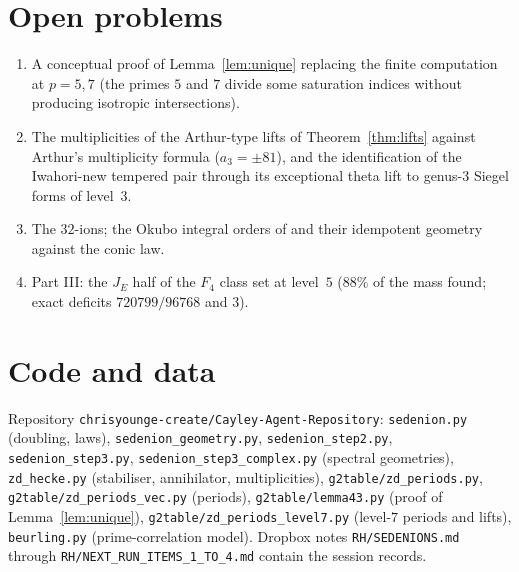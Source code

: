 \documentclass[11pt]{amsart}
\theoremstyle{definition}
\begin{document}
\section{Open problems}
\begin{enumerate}[leftmargin=2em]
\item A conceptual proof of Lemma~\ref{lem:unique} replacing the finite computation at $p=5,7$ (the primes $5$ and $7$ divide some saturation indices without producing isotropic intersections).
\item The multiplicities of the Arthur-type lifts of Theorem~\ref{thm:lifts} against Arthur's multiplicity formula ($a_3=\pm 81$), and the identification of the Iwahori-new tempered pair through its exceptional theta lift to genus-$3$ Siegel forms of level~$3$.
\item The $32$-ions; the Okubo integral orders of \cite{Corr26} and their idempotent geometry against the conic law.
\item Part III: the $J_E$ half of the $F_4$ class set at level~$5$ ($88\%$ of the mass found; exact deficits $720799/96768$ and $3$).
\end{enumerate}

\appendix
\section{Code and data}
Repository \texttt{chrisyounge-create/Cayley-Agent-Repository}: \texttt{sedenion.py} (doubling, laws), \texttt{sedenion\_geometry.py}, \texttt{sedenion\_step2.py}, \texttt{sedenion\_step3.py}, \texttt{sedenion\_step3\_complex.py} (spectral geometries), \texttt{zd\_hecke.py} (stabiliser, annihilator, multiplicities), \texttt{g2table/zd\_periods.py}, \texttt{g2table/zd\_periods\_vec.py} (periods), \texttt{g2table/lemma43.py} (proof of Lemma~\ref{lem:unique}), \texttt{g2table/zd\_periods\_level7.py} (level-$7$ periods and lifts), \texttt{beurling.py} (prime-correlation model). Dropbox notes \texttt{RH/SEDENIONS.md} through \texttt{RH/NEXT\_RUN\_ITEMS\_1\_TO\_4.md} contain the session records.
\end{document}
